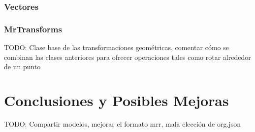 \subsubsection{Vectores}
\subsubsection{MrTransforms}
TODO: Clase base de las transformaciones geométricas, comentar cómo se combinan las clases anteriores para ofrecer operaciones tales como rotar alrededor de un punto




\section{Conclusiones y Posibles Mejoras}

TODO: Compartir modelos, mejorar el formato mrr, mala elección de org.json